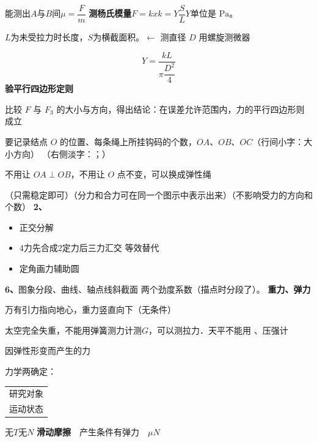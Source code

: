 能测出$A$与$B$间$\mu=\dfrac{F}{m}$ %
\textbf{测杨氏模量}\quad $F=kx$\quad $k=Y\dfrac{S}{L}$\quad $Y$单位是 $\mathrm{Pa}$。

$L$为未受拉力时长度，$S$为横截面积。$\leftarrow$ 测直径 $D$ 用螺旋测微器 %

\[ Y=\frac{kL}{\pi\dfrac{D^2}{4}} \]
\textbf{验平行四边形定则} %


比较 $F$ 与 $F_3$ 的大小与方向，得出结论：在误差允许范围内，力的平行四边形则成立

要记录结点 $O$ 的位置、每条绳上所挂钩码的个数，$OA$、$OB$、$OC$（行间小字：大小方向）
（右侧淡字：；）

不用让 $OA\perp OB$，不用让 $O$ 点不变，可以换成弹性绳

（只需稳定即可）\quad（分力和合力可在同一个图示中表示出来）\quad（不影响受力的方向和个数）
\textbf{2、}
\begin{itemize}
\item 正交分解
\item 4力\quad 先合成2定力\quad 后三力汇交 \quad 等效替代
\item 定角\quad 画力\quad 辅助圆
\end{itemize}
\textbf{6、}图象分段、曲线、轴点线斜截面
两个劲度系数（描点时分段了）。
\textbf{重力、弹力}\par
万有引力指向地心，重力竖直向下（无条件）\par
太空完全失重，不能用弹簧测力计测$G$，可以测拉力．天平不能用 、压强计\par
{}因弹性形变而产生的力\par
力学两确定：\begin{tabular}[t]{@{}l@{}}研究对象\\运动状态\end{tabular}
无$T$无$N$
\textbf{滑动摩擦}　产生条件有弹力　$\mu N$

